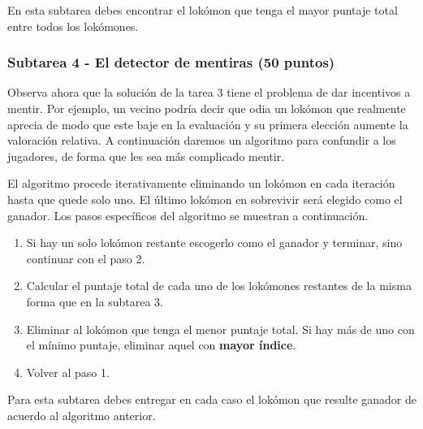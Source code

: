 \documentclass{oci}
\begin{document}

En esta subtarea debes encontrar el lokómon que tenga el mayor puntaje total
entre todos los lokómones.

\begin{sampleDescription}
\end{sampleDescription}

\subsubsection*{Subtarea 4 - El detector de mentiras (50 puntos)}
Observa ahora que la solución de la tarea 3 tiene el problema de dar incentivos
a mentir.
Por ejemplo, un vecino podría decir que odia un lokómon que realmente aprecia de
modo que este baje en la evaluación y su primera elección aumente la
valoración relativa. 
A continuación daremos un algoritmo para confundir a los jugadores, de forma que
les sea más complicado mentir.

El algoritmo procede iterativamente eliminando un lokómon en cada iteración
hasta que quede solo uno.
El último lokómon en sobrevivir será elegido como el ganador.
Los pasos específicos del algoritmo se muestran a continuación.

\begin{enumerate}
	\item Si hay un solo lokómon restante escogerlo como el ganador y terminar,
    sino continuar con el paso 2.
	\item Calcular el puntaje total de cada uno de los lokómones restantes de
    la misma forma que en la subtarea 3.
	\item Eliminar al lokómon que tenga el menor puntaje total.
    Si hay más de uno con el mínimo puntaje, eliminar aquel con \textbf{mayor
      índice}.
	\item Volver al paso 1.
\end{enumerate}

Para esta subtarea debes entregar en cada caso el lokómon que resulte ganador de
acuerdo al algoritmo anterior.

\begin{sampleDescription}
\end{sampleDescription}
\end{document}
